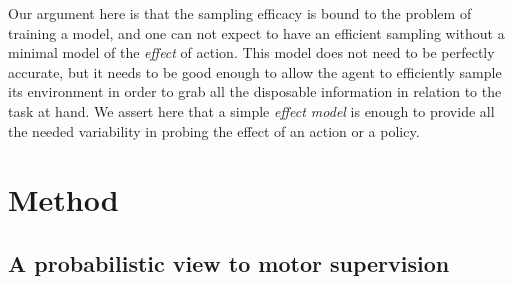 \documentclass[runningheads]{llncs}
\begin{document}
Our argument here is that the sampling efficacy is bound to the problem of training a model, and one can not expect to have an efficient sampling without a minimal model of the \emph{effect} of action. This model does not need to be perfectly accurate, but it needs to be good enough to allow the agent to efficiently sample its environment in order to grab all the disposable information in relation to the task at hand. We assert here that a simple \emph{effect model} is enough to provide all the needed variability in probing the effect of an action or a policy. 






\section{Method}

\subsection{A probabilistic view to motor supervision}
\end{document}
